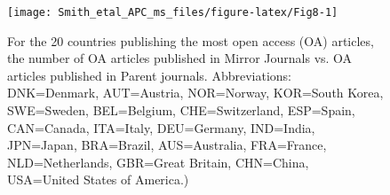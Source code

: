 \documentclass[
  english,
  man]{apa6}
\begin{document}
\begin{figure}

{\centering \texttt{[image: Smith\_etal\_APC\_ms\_files/figure-latex/Fig8-1]} 

}

\caption{For the 20 countries publishing the most open access (OA) articles, the number of OA articles published in Mirror Journals vs. OA articles published in Parent journals. Abbreviations: DNK=Denmark, AUT=Austria, NOR=Norway, KOR=South Korea, SWE=Sweden, BEL=Belgium, CHE=Switzerland, ESP=Spain, CAN=Canada, ITA=Italy, DEU=Germany, IND=India, JPN=Japan, BRA=Brazil, AUS=Australia, FRA=France, NLD=Netherlands, GBR=Great Britain, CHN=China, USA=United States of America.)}\label{fig:Fig8}
\end{figure}

\begin{table}


\end{table}
\end{document}
